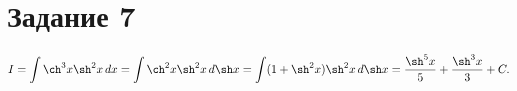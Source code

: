 \section{Задание 7}
\begin{multline*}
    I = \int \ch^3 x \sh^2 x \, dx = \int \ch^2 x \sh^2 x \, d \sh x = 
    \int (1 + \sh^2 x) \sh^2 x \, d \sh x = \frac{\sh^5 x}{5} + \frac{\sh^3
    x}{3} + C.
\end{multline*}

